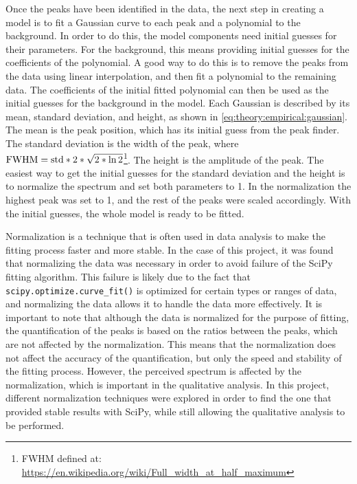 Once the peaks have been identified in the data, the next step in creating a model is to fit a Gaussian curve to each peak and a polynomial to the background.
In order to do this, the model components need initial guesses for their parameters.
For the background, this means providing initial guesses for the coefficients of the polynomial.
A good way to do this is to remove the peaks from the data using linear interpolation, and then fit a polynomial to the remaining data.
The coefficients of the initial fitted polynomial can then be used as the initial guesses for the background in the model.
Each Gaussian is described by its mean, standard deviation, and height, as shown in \cref{eq:theory:empirical:gaussian}.
The mean is the peak position, which has its initial guess from the peak finder.
The standard deviation is the width of the peak, where $\textnormal{FWHM} = \textnormal{std}*2*\sqrt{2*\ln{2}}$\footnote{FWHM defined at: \url{https://en.wikipedia.org/wiki/Full_width_at_half_maximum}}.
The height is the amplitude of the peak.
The easiest way to get the initial guesses for the standard deviation and the height is to normalize the spectrum and set both parameters to 1.
In the normalization the highest peak was set to 1, and the rest of the peaks were scaled accordingly.
With the initial guesses, the whole model is ready to be fitted.

Normalization is a technique that is often used in data analysis to make the fitting process faster and more stable.
In the case of this project, it was found that normalizing the data was necessary in order to avoid failure of the SciPy fitting algorithm.
This failure is likely due to the fact that \verb|scipy.optimize.curve_fit()| is optimized for certain types or ranges of data, and normalizing the data allows it to handle the data more effectively.
It is important to note that although the data is normalized for the purpose of fitting, the quantification of the peaks is based on the ratios between the peaks, which are not affected by the normalization.
This means that the normalization does not affect the accuracy of the quantification, but only the speed and stability of the fitting process.
However, the perceived spectrum is affected by the normalization, which is important in the qualitative analysis.
In this project, different normalization techniques were explored in order to find the one that provided stable results with SciPy, while still allowing the qualitative analysis to be performed.

